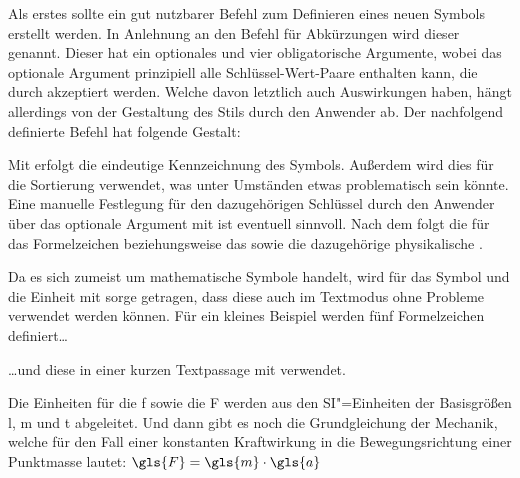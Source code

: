 \documentclass[%
  english,ngerman,%
  geometry=no,DIV=12,automark,%
]{tudscrartcl}
\begin{document}
Als erstes sollte ein gut nutzbarer Befehl zum Definieren eines neuen Symbols 
erstellt werden. In Anlehnung an den Befehl für Abkürzungen wird dieser 
 genannt. Dieser hat ein optionales und vier obligatorische 
Argumente, wobei das optionale Argument prinzipiell alle Schlüssel-Wert-Paare 
enthalten kann, die durch  akzeptiert werden. Welche davon 
letztlich auch Auswirkungen haben, hängt allerdings von der Gestaltung des 
Stils durch den Anwender ab. Der nachfolgend definierte Befehl hat folgende 
Gestalt:
%
\par\vspace{\baselineskipglue}\noindent
{}\LParameter{}%
\par\vspace{\baselineskipglue}\noindent
%
Mit  erfolgt die eindeutige Kennzeichnung des Symbols. Außerdem 
wird dies für die Sortierung verwendet, was unter Umständen etwas problematisch 
sein könnte. Eine manuelle Festlegung für den dazugehörigen Schlüssel durch den 
Anwender über das optionale Argument mit  ist 
eventuell sinnvoll. Nach dem  folgt die  für 
das Formelzeichen beziehungsweise das  sowie die dazugehörige 
physikalische .
%
\TutorialHook{\let\newcommand\renewcommand}
\begin{Tutorial}
\newcommand*{\newsymbol}[5][]{%
  \newglossaryentry{#2}{%
    type=symbols,%
    description={},%
    name={#3},%
    symbol={\ensuremath{#4}},%
    user1={\ensuremath{\mathrm{#5}}},%
    sort={#2},%
    #1%
  }%
}
\end{Tutorial}
%
Da es sich zumeist um mathematische Symbole handelt, wird für das Symbol und 
die Einheit mit  sorge getragen, dass diese auch im 
Textmodus ohne Probleme verwendet werden können. 
Für ein kleines Beispiel werden fünf Formelzeichen definiert\dots
%
\begin{Tutorial}
\end{Tutorial}
%
\dots und diese in einer kurzen Textpassage mit  
verwendet.
%
\begin{Tutorial'}
Die Einheiten für die \gls{f} sowie die \gls{F} werden aus den 
SI"=Einheiten der Basisgrößen \gls{l}, \gls{m} und \gls{t} abgeleitet.
Und dann gibt es noch die Grundgleichung der Mechanik, welche für den
Fall einer konstanten Kraftwirkung in die Bewegungsrichtung einer
Punktmasse lautet:
$\gls{F} = \gls{m} \cdot \gls{a}$
\end{Tutorial'}
\end{document}
